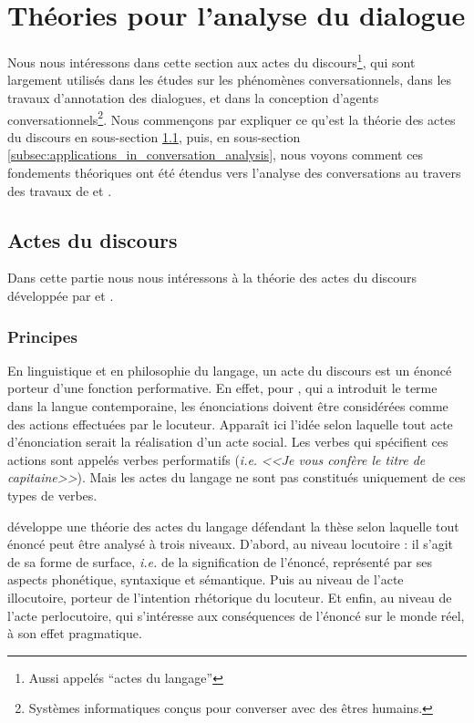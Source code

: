 \documentclass[10pt,a4paper,twoside]{article}
\newcommand{\quotes}[1]{``#1''}
\begin{document}
\section{Théories pour l'analyse du dialogue}
\label{sec:dialog_analysis_theories}

Nous nous intéressons dans cette section aux actes du discours\footnote{Aussi appelés \quotes{actes du langage}}, qui sont largement utilisés dans les études sur les phénomènes conversationnels, dans les travaux d'annotation des dialogues, et dans la conception d'agents conversationnels\footnote{Systèmes informatiques conçus pour converser avec des êtres humains.}. Nous commençons par expliquer ce qu'est la théorie des actes du discours en sous-section \ref{subsec:speech_acts}, puis, en sous-section \ref{subsec:applications_in_conversation_analysis}, nous voyons comment ces fondements théoriques ont été étendus vers l'analyse des conversations au travers des travaux de \citet{traum1992conversation} et \citet{poesio1997conversational}.

\subsection{Actes du discours}
\label{subsec:speech_acts}

Dans cette partie nous nous intéressons à la théorie des actes du discours développée par \citet{austin1975how} et \citet{searle1969speech}.

\subsubsection{Principes}

En linguistique et en philosophie du langage, un acte du discours est un énoncé porteur d'une fonction performative. En effet, pour \citeauthor{austin1975how}, qui a introduit le terme dans la langue contemporaine, les énonciations doivent être considérées comme des actions effectuées par le locuteur. Apparaît ici l’idée selon laquelle tout acte d’énonciation serait la réalisation d’un acte social. Les verbes qui spécifient ces actions sont appelés verbes performatifs (\textit{i.e.} \textit{<<Je vous confère le titre de capitaine>>}). Mais les actes du langage ne sont pas constitués uniquement de ces types de verbes. 

\citet{austin1975how} développe une théorie des actes du langage défendant la thèse selon laquelle tout énoncé peut être analysé à trois niveaux. D'abord, au niveau locutoire : il s'agit de sa forme de surface, \textit{i.e.} de la signification de l'énoncé, représenté par ses aspects phonétique, syntaxique et sémantique. Puis au niveau de l'acte illocutoire, porteur de l'intention rhétorique du locuteur. Et enfin, au niveau de l'acte perlocutoire, qui s'intéresse aux conséquences de l'énoncé sur le monde réel, à son effet pragmatique. 
\end{document}
